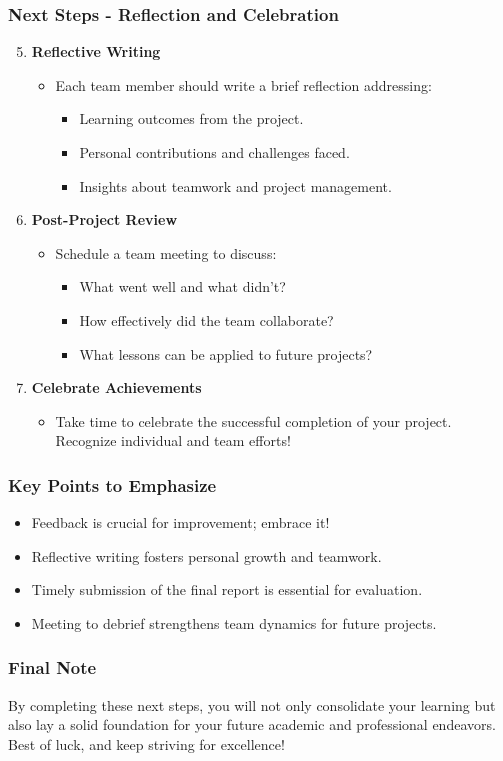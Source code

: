 \documentclass[aspectratio=169]{beamer}
\begin{document}
\begin{frame}[fragile]
  \frametitle{Next Steps - Reflection and Celebration}
  \begin{enumerate}
    \setcounter{enumi}{4} %
    \item \textbf{Reflective Writing}
    \begin{itemize}
      \item Each team member should write a brief reflection addressing:
      \begin{itemize}
        \item Learning outcomes from the project.
        \item Personal contributions and challenges faced.
        \item Insights about teamwork and project management.
      \end{itemize}
    \end{itemize}

    \item \textbf{Post-Project Review}
    \begin{itemize}
      \item Schedule a team meeting to discuss:
      \begin{itemize}
        \item What went well and what didn’t?
        \item How effectively did the team collaborate?
        \item What lessons can be applied to future projects?
      \end{itemize}
    \end{itemize}

    \item \textbf{Celebrate Achievements}
    \begin{itemize}
      \item Take time to celebrate the successful completion of your project. Recognize individual and team efforts!
    \end{itemize}
  \end{enumerate}
\end{frame}

\begin{frame}[fragile]
  \frametitle{Key Points to Emphasize}
  \begin{itemize}
    \item Feedback is crucial for improvement; embrace it!
    \item Reflective writing fosters personal growth and teamwork.
    \item Timely submission of the final report is essential for evaluation.
    \item Meeting to debrief strengthens team dynamics for future projects.
  \end{itemize}
\end{frame}

\begin{frame}[fragile]
  \frametitle{Final Note}
  By completing these next steps, you will not only consolidate your learning but also lay a solid foundation for your future academic and professional endeavors. Best of luck, and keep striving for excellence!
\end{frame}
\end{document}
